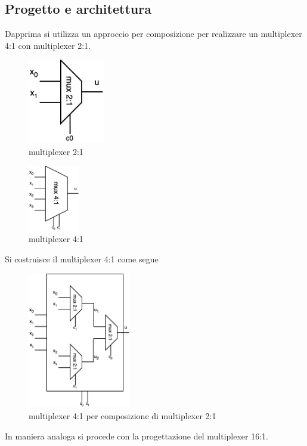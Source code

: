 \subsection{Progetto e architettura}
Dapprima si utilizza un approccio per composizione per realizzare un multiplexer 4:1 con multiplexer 2:1.\\
\begin{figure}[H]
	\centering
	\includegraphics[width=0.3\textwidth]{img/02}
	\caption{multiplexer 2:1}
	\label{mux_2:1} 
\end{figure}
\begin{figure}[H]
	\centering
	\includegraphics[width=0.2\textwidth]{img/03}
	\caption{multiplexer 4:1}
	\label{mux_4:1} 
\end{figure}
Si costruisce il multiplexer 4:1 come segue
\begin{figure}[H]
	\centering
	\includegraphics[width=0.4\textwidth]{img/04}
	\caption{multiplexer 4:1 per composizione di multiplexer 2:1}
	\label{mux_4:1_comp} 
\end{figure}
In maniera analoga si procede con la progettazione del multiplexer 16:1.
